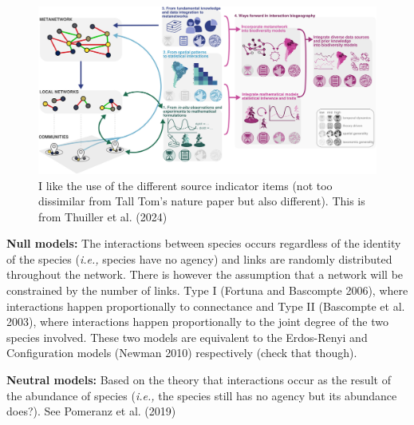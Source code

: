 \documentclass[
  letterpaper,
  DIV=11,
  numbers=noendperiod]{scrartcl}
\begin{document}
\begin{figure}[H]

{\centering \includegraphics{images/thullier_2023_concept.jpeg}

}

\caption{I like the use of the different source indicator items (not too
dissimilar from Tall Tom's nature paper but also different). This is
from Thuiller et al. (2024)}

\end{figure}%

\textbf{Null models:} The interactions between species occurs regardless
of the identity of the species (\emph{i.e.,} species have no agency) and
links are randomly distributed throughout the network. There is however
the assumption that a network will be constrained by the number of
links. Type I (Fortuna and Bascompte 2006), where interactions happen
proportionally to connectance and Type II (Bascompte et al. 2003), where
interactions happen proportionally to the joint degree of the two
species involved. These two models are equivalent to the Erdos-Renyi and
Configuration models (Newman 2010) respectively (check that though).

\textbf{Neutral models:} Based on the theory that interactions occur as
the result of the abundance of species (\emph{i.e.,} the species still
has no agency but its abundance does?). See Pomeranz et al. (2019)
\end{document}
